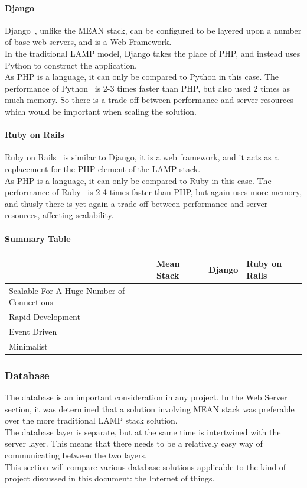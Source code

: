 \documentclass[preprint,12pt,3p]{elsarticle}
\newcommand{\checkmark}{\ding{51}}%
\newcommand{\xmark}{\ding{55}}%
\begin{document}
\paragraph{Django}
Django~\cite{django}, unlike the MEAN stack, can be configured to be layered upon a number of base web servers, and is a Web Framework.\\
In the traditional LAMP model, Django takes the place of PHP, and instead uses Python to construct the application.\\
As PHP is a language, it can only be compared to Python in this case. The performance of Python~\cite{djangovsphp} is 2-3 times faster than PHP, but also used 2 times as much memory. So there is a trade off between performance and server resources which would be important when scaling the solution.

\paragraph{Ruby on Rails}
Ruby on Rails~\cite{ruby} is similar to Django, it is a web framework, and it acts as a replacement for the PHP element of the LAMP stack.\\
As PHP is a language, it can only be compared to Ruby in this case. The performance of Ruby~\cite{rubyvsphp} is 2-4 times faster than PHP, but again uses more memory, and thusly there is yet again a trade off between performance and server resources, affecting scalability.

\paragraph{Summary Table}
\begin{tabular}{| l | l | l | l |}
    \hline
          & Mean Stack & Django & Ruby on Rails \\ \hline
    Scalable For A Huge Number of Connections & \checkmark & \xmark & \xmark\\ \hline
    Rapid Development & \checkmark & \checkmark & \checkmark\\ \hline
    Event Driven & \checkmark & \xmark & \xmark\\ \hline
    Minimalist & \checkmark & \xmark & \xmark\\ \hline
\end{tabular}


\subsubsection{Database}
The database is an important consideration in any project. In the Web Server section, it was determined that a solution involving MEAN stack was preferable over the more traditional LAMP stack solution.\\
The database layer is separate, but at the same time is intertwined with the server layer. This means that there needs to be a relatively easy way of communicating between the two layers.\\
This section will compare various database solutions applicable to the kind of project discussed in this document: the Internet of things.\\
\end{document}
